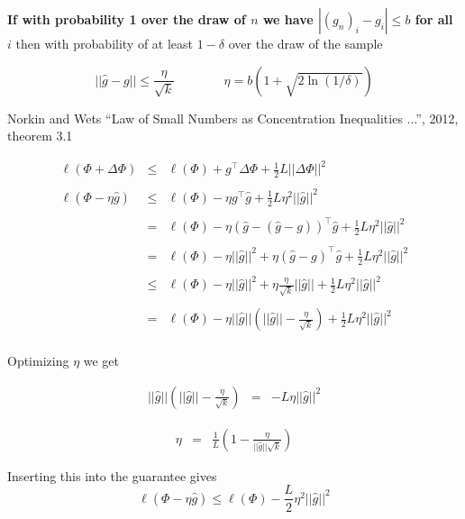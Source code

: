 {\vfill
{\bf If with probability 1 over the draw of $n$ we have $|(g_n)_i - g_i| \leq b$ for all $i$} then with probability of at least $1-\delta$ over the draw of the sample

\vfill

$$||\hat{g} - g|| \leq \frac{\eta}{\sqrt{k}} \;\;\;\;\;\;\;\;\;\;\;\;\;\; \eta = b\left(1 + \sqrt{2 \ln (1/ \delta) }\right)$$


\vfill
{\huge Norkin and Wets ``Law of Small Numbers as Concentration Inequalities ...'', 2012, theorem 3.1}

\begin{eqnarray*}
 \ell(\Phi + \Delta \Phi) & \leq &   \ell(\Phi) + g^\top \Delta \Phi + \frac{1}{2} L ||\Delta \Phi||^2 \\
  \\
\ell(\Phi - \eta\widehat{g}) & \leq & \ell(\Phi) - \eta g^\top \widehat{g} + \frac{1}{2}L \eta^2 ||\widehat{g}||^2\\
  \\
  & = &  \ell(\Phi) - \eta (\widehat{g} - (\widehat{g} -g))^\top \widehat{g} + \frac{1}{2}L\eta^2 ||\widehat{g}||^2 \\
  \\
  & = &  \ell(\Phi) - \eta ||\widehat{g}||^2 + \eta(\widehat{g} -g)^\top \widehat{g} + \frac{1}{2}L \eta^2 ||\widehat{g}||^2 \\
  \\
  & \leq &  \ell(\Phi) - \eta ||\widehat{g}||^2 + \eta\frac{\eta}{\sqrt{k}}||\widehat{g}|| + \frac{1}{2}L \eta^2 ||\widehat{g}||^2 \\
  \\
  & = & \ell(\Phi) - \eta ||\widehat{g}||\left(||\widehat{g}|| - \frac{\eta}{\sqrt{k}} \right)  + \frac{1}{2}L \eta^2 ||\widehat{g}||^2 \\
\end{eqnarray*}


Optimizing $\eta$ we get

\begin{eqnarray*}
 ||\widehat{g}||\left(||\widehat{g}|| - \frac{\eta}{\sqrt{k}} \right) & = & - L \eta ||\widehat{g}||^2
\end{eqnarray*}


\begin{eqnarray*}
\eta & = & \frac{1}{L}\left(1 - \frac{\eta}{||\widehat{g}||\sqrt{k}}\right)
\end{eqnarray*}

\vfill
Inserting this into the guarantee gives
$$\ell(\Phi - \eta \widehat{g}) \leq \ell(\Phi) - \frac{L}{2}\eta^2||\widehat{g}||^2$$

}
